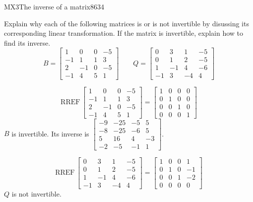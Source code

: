 \begin{exercise}{MX3}{The inverse of a matrix}{8634} 
\begin{exerciseStatement} 

 Explain why each of the following matrices is or is not invertible by disussing its corresponding linear transformation. If the matrix is invertible, explain how to find its inverse. \[
\hspace{2em}
B = \left[\begin{array}{cccc}
1 & 0 & 0 & -5 \\
-1 & 1 & 1 & 3 \\
2 & -1 & 0 & -5 \\
-1 & 4 & 5 & 1
\end{array}\right]
\hspace{2em}
Q = \left[\begin{array}{cccc}
0 & 3 & 1 & -5 \\
0 & 1 & 2 & -5 \\
1 & -1 & 4 & -6 \\
-1 & 3 & -4 & 4
\end{array}\right]
\hspace{2em}
        \] 

 \end{exerciseStatement}
 \begin{exerciseAnswer} 

 \[\mathrm{RREF}\,\left[\begin{array}{cccc}
1 & 0 & 0 & -5 \\
-1 & 1 & 1 & 3 \\
2 & -1 & 0 & -5 \\
-1 & 4 & 5 & 1
\end{array}\right]=\left[\begin{array}{cccc}
1 & 0 & 0 & 0 \\
0 & 1 & 0 & 0 \\
0 & 0 & 1 & 0 \\
0 & 0 & 0 & 1
\end{array}\right]\] \(B\) is invertible. Its inverse is \(\left[\begin{array}{cccc}
-9 & -25 & -5 & 5 \\
-8 & -25 & -6 & 5 \\
5 & 16 & 4 & -3 \\
-2 & -5 & -1 & 1
\end{array}\right]\). 

 

 \[\mathrm{RREF}\,\left[\begin{array}{cccc}
0 & 3 & 1 & -5 \\
0 & 1 & 2 & -5 \\
1 & -1 & 4 & -6 \\
-1 & 3 & -4 & 4
\end{array}\right]=\left[\begin{array}{cccc}
1 & 0 & 0 & 1 \\
0 & 1 & 0 & -1 \\
0 & 0 & 1 & -2 \\
0 & 0 & 0 & 0
\end{array}\right]\] \(Q\) is not invertible. 

 \end{exerciseAnswer}
 \end{exercise}


